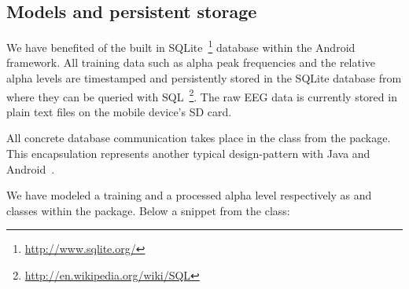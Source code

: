 \documentclass[a4paper,10pt,english,lof,lot,twoside]{puthesis}
\begin{document}
\subsection{Models and persistent storage}
\label{ch-implementation/index:ch-implementation-models-persistent-storage}\label{ch-implementation/index:models-and-persistent-storage}
We have benefited of the built in SQLite \footnote{
\href{http://www.sqlite.org/}{http://www.sqlite.org/}
} database
within the Android framework. All training data such as alpha peak frequencies and
the relative alpha levels are timestamped and persistently stored in the SQLite database
from where they can be
queried with SQL \footnote{
\href{http://en.wikipedia.org/wiki/SQL}{http://en.wikipedia.org/wiki/SQL}
}. The raw EEG data is currently
stored in plain text files on the mobile device's SD card.

All concrete database communication takes place in the  class from the
 package. This encapsulation
represents another typical design-pattern with Java and Android \cite{wei_android_2012}.

We have modeled a training and a processed alpha level respectively as
 and  classes within the  package.
Below a snippet from the  class:
\end{document}
